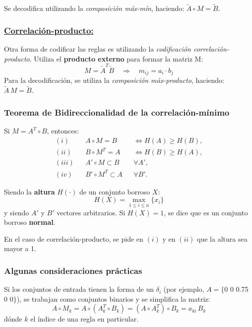 \documentclass[10pt,a4paper]{article}
\begin{document}
Se decodifica utilizando la \textit{composición máx-mín}, haciendo: $\tilde{A}\circ M=\tilde{B}$.

\subsubsection*{\underline{Correlación-producto:}}

Otra forma de codificar las reglas es utilizando la \textit{codificación correlación-producto}. Utiliza el \textbf{producto externo} para formar la matriz M:
\[
M = \tilde{A}^T \tilde{B} \quad \Rightarrow \quad m_{ij} = a_i \cdot b_j
\]
Para la decodificación, se utiliza la \textit{composición máx-producto}, haciendo: $\tilde{A} \, M=\tilde{B}$.

\subsubsection{Teorema de Bidireccionalidad de la correlación-mínimo}

\begin{multicols}{2}
Si $M=A^T \circ B$, entonces:
\begin{align*}
(i) && A \circ M = B && \iff H(A) \geq H(B), \\
(ii) && B \circ M^T = A && \iff H(B) \geq H(A), \\
(iii) && A' \circ M \subset B && \forall A', \\
(iv) && B' \circ M^T \subset A && \forall B'.
\end{align*}

\columnbreak

Siendo la \textbf{altura} $H(\cdot)$ de un conjunto borroso $X$:
\[
H(X)=\max_{1\leq i \leq n} \{x_i\}
\] 
y siendo $A'$ y $B'$ vectores arbitrarios. Si $H(X)=1$, se dice que es un conjunto borroso \textbf{normal}.

\end{multicols}

En el caso de correlación-producto, se pide en $(i)$ y en $(ii)$ que la altura sea mayor a 1.

\subsubsection{Algunas consideraciones prácticas}

Si los conjuntos de entrada tienen la forma de un $\delta_i$ (por ejemplo, $A=\{$0 0 0.75 0 0$\}$), se trabajan como conjuntos binarios y se simplifica la matriz: 
\[
A \circ M_k=A\circ(A^T_k\circ B_k)=(A \circ A_k^T)\circ B_k = a_{ki}\, B_k
\]
dónde $k$ el índice de una regla en particular.
\end{document}
